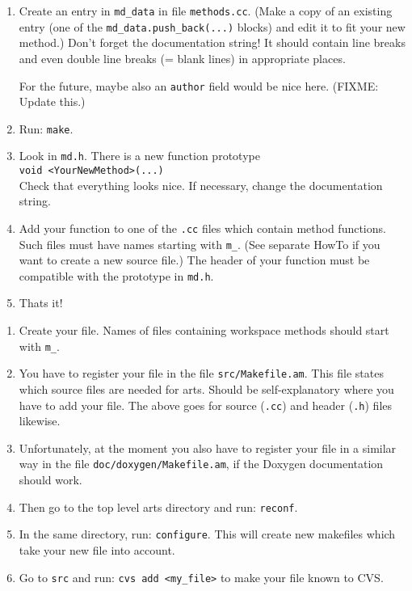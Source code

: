 \begin{enumerate}
\item Create an entry in \verb|md_data| in file \verb|methods.cc|.
  (Make a copy of an existing entry (one of the
  \verb|md_data.push_back(...)| blocks) and edit it to fit your new
  method.) Don't forget the documentation string! It should contain
  line breaks and even double line breaks (= blank lines) in
  appropriate places.
  
  For the future, maybe also an \verb|author| field would be nice
  here. (FIXME: Update this.)
\item Run:
  \verb|make|.
\item Look in \verb|md.h|. There is a new function prototype\\
  \verb|void <YourNewMethod>(...)|\\
  Check that everything looks nice.
  If necessary, change the documentation string.
\item Add your function to one of the \verb|.cc| files which contain method
  functions. Such files must have names starting with \verb|m_|. (See
  separate HowTo if you want to create a new source file.) The header
  of your function must be compatible with the prototype in \verb|md.h|.
\item Thats it!
\end{enumerate}


\begin{enumerate}
\item Create your file. Names of files containing workspace methods should
  start with \verb|m_|.
\item You have to register your file in the file \verb|src/Makefile.am|.
  This file states which source files are needed for arts. Should be
  self-explanatory where you have to add your file. The above goes for
  source (\verb|.cc|) and header (\verb|.h|) files likewise.
\item Unfortunately, at the moment you also have to register your file
  in a similar way in the file \verb|doc/doxygen/Makefile.am|, if the
  Doxygen documentation should work. 
\item Then go to the top level arts directory and run: \verb|reconf|.
\item In the same directory, run: \verb|configure|.  This will create
  new makefiles which take your new file into account.
\item Go to \verb|src| and run: \verb|cvs add <my_file>| to make your
  file known to CVS.
\end{enumerate}


